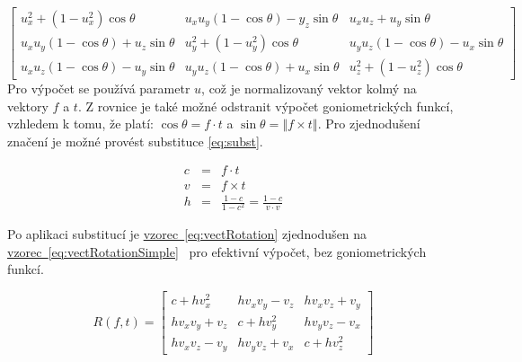 \documentclass[czech,master]{diploma}
\newcommand{\fromVect}{f}
\newcommand{\toVect}{t}
\begin{document}
\begin{equation} \label{eq:vectRotation}
  \begin{bmatrix}
    u_x^2 + \left ( 1 - u_x^2\right ) \cos\theta                & u_x u_y \left ( 1 - \cos \theta \right ) - y_z \sin \theta & u_x u_z + u_y \sin \theta                                  \\
    u_x u_y \left ( 1 -  \cos \theta \right ) + u_z \sin \theta & u_y^2 + \left ( 1 - u_y^2\right ) \cos\theta               & u_y u_z \left ( 1 - \cos \theta \right ) - u_x \sin \theta \\
    u_x u_z \left ( 1 - \cos \theta \right ) - u_y \sin \theta  & u_y u_z \left ( 1 - \cos \theta \right ) + u_x \sin \theta & u_z^2 + \left ( 1 - u_z^2\right ) \cos\theta
  \end{bmatrix}
\end{equation}
Pro výpočet se používá parametr \(u\), což je normalizovaný vektor kolmý na vektory \(\fromVect\) a \(\toVect\). Z rovnice je také možné odstranit výpočet goniometrických funkcí, vzhledem k tomu, že platí: \(\cos \theta = \fromVect \cdot \toVect\) a \(\sin \theta = \left\Vert \fromVect \times \toVect \right\Vert\). Pro zjednodušení značení je možné provést substituce \hyperref[eq:subst]{\ref{eq:subst}}.

\begin{eqnarray} \label{eq:subst}
  c &=& \fromVect \cdot \toVect \nonumber\\
  v &=& \fromVect \times \toVect \nonumber\\
  h &=& \frac{1 - c}{1 - c^2} = \frac{1 - c}{v \cdot v} \nonumber
\end{eqnarray}

Po aplikaci substitucí je \hyperref[eq:vectRotation]{vzorec~\ref{eq:vectRotation}} zjednodušen na \hyperref[eq:vectRotationSimple]{vzorec~\ref{eq:vectRotationSimple}}~\cite{MollerHughesVectRotation} pro efektivní výpočet, bez goniometrických funkcí.

\begin{equation} \label{eq:vectRotationSimple}
  R\left ( \fromVect, \toVect \right) = \begin{bmatrix}
    c + h v_x^2     & h v_x v_y - v_z & h v_x v_z + v_y \\
    h v_x v_y + v_z & c + h v_y^2     & h v_y v_z - v_x \\
    h v_x v_z - v_y & h v_y v_z + v_x & c + h v_z^2
  \end{bmatrix}
\end{equation}
\end{document}
